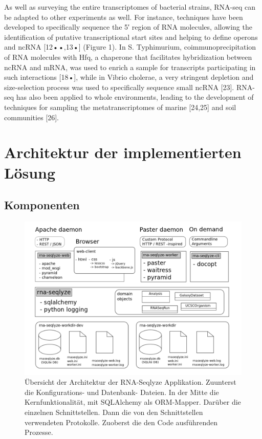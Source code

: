 \documentclass[a4paper]{thesis}
\begin{document}
As well as surveying the entire transcriptomes of bacterial strains, RNA-seq can be adapted to other experiments as well. For instance, techniques have been developed to specifically sequence the 5′ region of RNA molecules, allowing the identification of putative transcriptional start sites and helping to define operons and ncRNA [12••,13•] (Figure 1). In S. Typhimurium, coimmunoprecipitation of RNA molecules with Hfq, a chaperone that facilitates hybridization between ncRNA and mRNA, was used to enrich a sample for transcripts participating in such interactions [18•], while in Vibrio cholerae, a very stringent depletion and size-selection process was used to specifically sequence small ncRNA [23]. RNA-seq has also been applied to whole environments, leading to the development of techniques for sampling the metatranscriptomes of marine [24,25] and soil communities [26].

\section{Architektur der implementierten Lösung}

\subsection{Komponenten}

\begin{figure}
	\includegraphics{img/overview_architektur}
	\caption{
Übersicht der Architektur der RNA-Seqlyze Applikation.
Zuunterst die Konfigurations- und Datenbank- Dateien.
In der Mitte die Kernfunktionalität, mit SQLAlchemy
als ORM-Mapper. Darüber die einzelnen Schnittstellen.
Dann die von den Schnittstellen verwendeten Protokolle.
Zuoberst die den Code ausführenden Prozesse.
}
	\label{fig:arch}
\end{figure}
\end{document}
